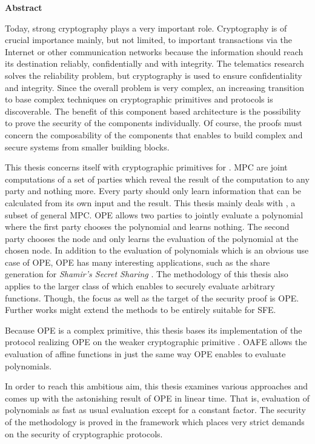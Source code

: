 \noindent{}\textsf{\textbf{\huge Abstract}}

\bigskip{}

\noindent{}Today, strong cryptography plays a very important role. Cryptography
is of crucial importance mainly, but not limited, to important transactions via
the Internet or other communication networks because the information should
reach its destination reliably, confidentially and with integrity. The
telematics research solves the reliability problem, but cryptography is used to
ensure confidentiality and integrity. Since the overall problem is very complex,
an increasing transition to base complex techniques on cryptographic primitives
and protocols is discoverable. The benefit of this component based architecture
is the possibility to prove the security of the components individually. Of
course, the proofs must concern the composability of the components that enables
to build complex and secure systems from smaller building blocks.

This thesis concerns itself with cryptographic primitives for . MPC are joint computations of a set of parties
which reveal the result of the computation to any party and nothing more. Every
party should only learn information that can be calculated from its own input
and the result. This thesis mainly deals with , a subset of general MPC. OPE allows two parties to jointly
evaluate a polynomial where the first party chooses the polynomial and learns
nothing. The second party chooses the node and only learns the evaluation of the
polynomial at the chosen node. In addition to the evaluation of polynomials
which is an obvious use case of OPE, OPE has many interesting applications,
such as the share generation for \emph{Shamir's Secret Sharing} \cite{shamir79}.
The methodology of this thesis also applies to the larger class of
 which enables to securely evaluate
arbitrary functions. Though, the focus as well as the target of the security
proof is OPE.  Further works might extend the methods to be entirely suitable
for SFE.

Because OPE is a complex primitive, this thesis bases its implementation of the
protocol realizing OPE on the weaker cryptographic primitive . OAFE allows the evaluation of affine
functions in just the same way OPE enables to evaluate polynomials.

In order to reach this ambitious aim, this thesis examines various approaches
and comes up with the astonishing result of OPE in linear time. That is,
evaluation of polynomials as fast as usual evaluation except for a constant
factor. The security of the methodology is proved in the  framework \cite{canetti05} which places very strict demands
on the security of cryptographic protocols.


